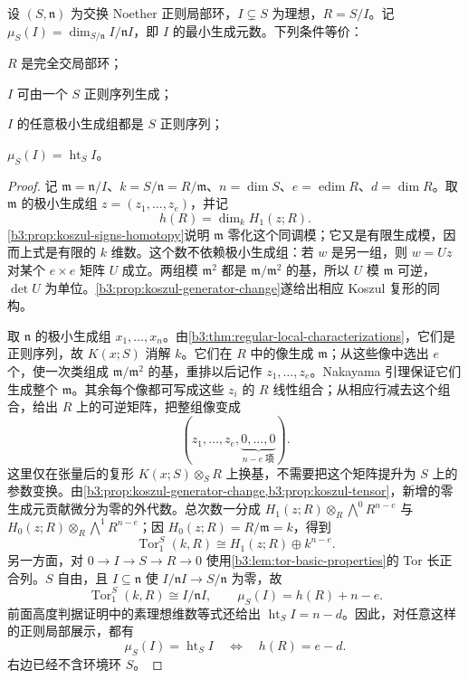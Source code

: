 \begin{theorem}\label{b3:thm:ci-presentation-independence}
	设 \((S,\mathfrak n)\) 为交换 Noether 正则局部环，\(I\subsetneq S\) 为理想，\(R=S/I\)。记 \(\mu_S(I)=\dim_{S/\mathfrak n}I/\mathfrak nI\)，即 \(I\) 的最小生成元数。下列条件等价：
	\begin{equivalences}
		\item \(R\) 是完全交局部环；
		\item \(I\) 可由一个 \(S\) 正则序列生成；
		\item \(I\) 的任意极小生成组都是 \(S\) 正则序列；
		\item \(\mu_S(I)=\operatorname{ht}_S I\)。
	\end{equivalences}
\end{theorem}
\begin{proof}
	记 \(\mathfrak m=\mathfrak n/I\)、\(k=S/\mathfrak n=R/\mathfrak m\)、\(n=\dim S\)、\(e=\operatorname{edim}R\)、\(d=\dim R\)。取 \(\mathfrak m\) 的极小生成组 \(z=(z_1,\ldots,z_e)\)，并记
	\[
		h(R)=\dim_k H_1(z;R).
	\]
	\cref{b3:prop:koszul-signs-homotopy}说明 \(\mathfrak m\) 零化这个同调模；它又是有限生成模，因而上式是有限的 \(k\) 维数。这个数不依赖极小生成组：若 \(w\) 是另一组，则 \(w=Uz\) 对某个 \(e\times e\) 矩阵 \(U\) 成立。两组模 \(\mathfrak m^2\) 都是 \(\mathfrak m/\mathfrak m^2\) 的基，所以 \(U\) 模 \(\mathfrak m\) 可逆，\(\det U\) 为单位。\cref{b3:prop:koszul-generator-change}遂给出相应 Koszul 复形的同构。

	取 \(\mathfrak n\) 的极小生成组 \(x_1,\ldots,x_n\)。由\cref{b3:thm:regular-local-characterizations}，它们是正则序列，故 \(K(x;S)\) 消解 \(k\)。它们在 \(R\) 中的像生成 \(\mathfrak m\)；从这些像中选出 \(e\) 个，使一次类组成 \(\mathfrak m/\mathfrak m^2\) 的基，重排以后记作 \(z_1,\ldots,z_e\)。Nakayama 引理保证它们生成整个 \(\mathfrak m\)。其余每个像都可写成这些 \(z_i\) 的 \(R\) 线性组合；从相应行减去这个组合，给出 \(R\) 上的可逆矩阵，把整组像变成
	\[
		(z_1,\ldots,z_e,\underbrace{0,\ldots,0}_{n-e\;\text{项}}).
	\]
	这里仅在张量后的复形 \(K(x;S)\otimes_SR\) 上换基，不需要把这个矩阵提升为 \(S\) 上的参数变换。由\cref{b3:prop:koszul-generator-change,b3:prop:koszul-tensor}，新增的零生成元贡献微分为零的外代数。总次数一分成 \(H_1(z;R)\otimes_R\bigwedge^0R^{n-e}\) 与 \(H_0(z;R)\otimes_R\bigwedge^1R^{n-e}\)；因 \(H_0(z;R)=R/\mathfrak m=k\)，得到
	\[
		\operatorname{Tor}_1^S(k,R) \cong H_1(z;R)\oplus k^{n-e}.
	\]
	另一方面，对 \(0\to I\to S\to R\to0\) 使用\cref{b3:lem:tor-basic-properties}的 Tor 长正合列。\(S\) 自由，且 \(I\subseteq\mathfrak n\) 使 \(I/\mathfrak nI\to S/\mathfrak n\) 为零，故
	\[
		\operatorname{Tor}_1^S(k,R)\cong I/\mathfrak nI, \qquad \mu_S(I)=h(R)+n-e.
	\]
	前面高度判据证明中的素理想维数等式还给出 \(\operatorname{ht}_S I=n-d\)。因此，对任意这样的正则局部展示，都有
	\[
		\mu_S(I)=\operatorname{ht}_S I \quad\Longleftrightarrow\quad h(R)=e-d.
	\]
	右边已经不含环境环 \(S\)。


\end{proof}
